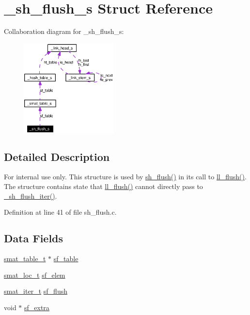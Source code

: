 \hypertarget{struct__sh__flush__s}{
\section{\_\-sh\_\-flush\_\-s Struct Reference}
\label{struct__sh__flush__s}
}
Collaboration diagram for \_\-sh\_\-flush\_\-s:\begin{figure}[H]
\begin{center}
\leavevmode
\includegraphics[width=140pt]{struct__sh__flush__s__coll__graph}
\end{center}
\end{figure}


\subsection{Detailed Description}
\begin{Desc}
\item[For internal use only.]
This structure is used by \hyperlink{group__dbprim__smat_ga22}{sh\_\-flush()} in its call to \hyperlink{group__dbprim__link_ga11}{ll\_\-flush()}. The structure contains state that \hyperlink{group__dbprim__link_ga11}{ll\_\-flush()} cannot directly pass to \hyperlink{group__dbprim__smat_ga28}{\_\-sh\_\-flush\_\-iter()}.\end{Desc}




Definition at line 41 of file sh\_\-flush.c.\subsection*{Data Fields}
\begin{CompactItemize}
\item 
\hyperlink{struct__smat__table__s}{smat\_\-table\_\-t} $\ast$ \hyperlink{struct__sh__flush__s_o0}{sf\_\-table}
\item 
\hyperlink{group__dbprim__smat_ga6}{smat\_\-loc\_\-t} \hyperlink{struct__sh__flush__s_o1}{sf\_\-elem}
\item 
\hyperlink{group__dbprim__smat_ga4}{smat\_\-iter\_\-t} \hyperlink{struct__sh__flush__s_o2}{sf\_\-flush}
\item 
void $\ast$ \hyperlink{struct__sh__flush__s_o3}{sf\_\-extra}
\end{CompactItemize}


